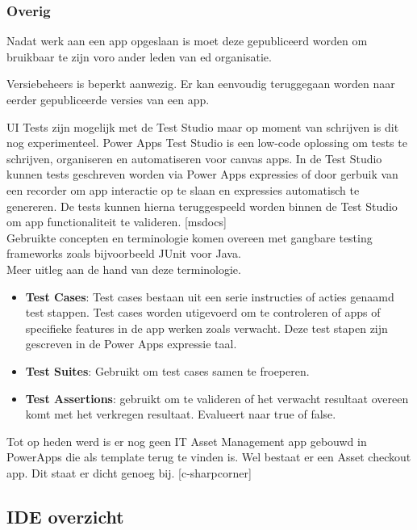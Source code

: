 \subsubsection{Overig}

Nadat werk aan een app opgeslaan is moet deze gepubliceerd worden om bruikbaar te zijn voro ander leden van ed organisatie.

Versiebeheers is beperkt aanwezig. Er kan eenvoudig teruggegaan worden naar eerder gepubliceerde versies van een app.

UI Tests zijn mogelijk met de Test Studio maar op moment van schrijven is dit nog experimenteel. Power Apps Test Studio is een low-code oplossing om tests te schrijven, organiseren en automatiseren voor canvas apps. In de Test Studio kunnen tests geschreven worden via Power Apps expressies of door gerbuik van een recorder om app interactie op te slaan en expressies automatisch te genereren. De tests kunnen hierna teruggespeeld worden binnen de Test Studio om app functionaliteit te valideren. [msdocs] \\ 
Gebruikte concepten en terminologie komen overeen met gangbare testing frameworks zoals bijvoorbeeld JUnit voor Java. \\
Meer uitleg aan de hand van deze terminologie. 
\begin{itemize}
    \item \textbf{Test Cases}: Test cases bestaan uit een serie instructies of acties genaamd test stappen. Test cases worden utigevoerd om te controleren of apps of specifieke features in de app werken zoals verwacht. Deze test stapen zijn gescreven in de Power Apps expressie taal.
    \item \textbf{Test Suites}: Gebruikt om test cases samen te froeperen.
    \item \textbf{Test Assertions}: gebruikt om te valideren of het verwacht resultaat overeen komt met het verkregen resultaat. Evalueert naar true of false.
\end{itemize}

Tot op heden werd is er nog geen IT Asset Management app gebouwd in PowerApps die als template terug te vinden is. Wel bestaat er een Asset checkout app. Dit staat er dicht genoeg bij. [c-sharpcorner]

\subsection{IDE overzicht}




